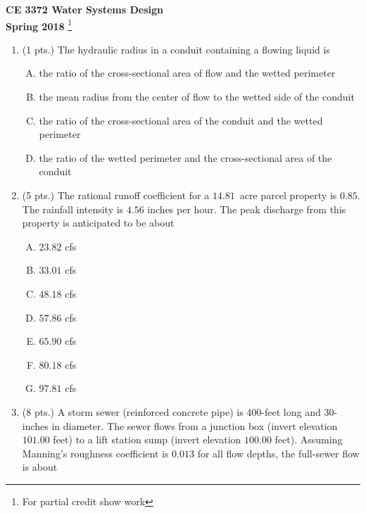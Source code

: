 \documentclass[11pt]{article}
\begin{document}
\begingroup
\begin{center}
{\textbf{{ CE 3372 Water Systems Design}  \\ Spring 2018} \footnote{For partial credit show work}
}
\end{center}
\endgroup


\begin{enumerate}
\item  (1 pts.)
The hydraulic radius in a conduit containing a flowing liquid is
\begin{enumerate} [(A)]
\item	the ratio of the cross-sectional area of flow and the wetted perimeter
\item	the mean radius from the center of flow to the wetted side of the conduit
\item	the ratio of the cross-sectional area of the conduit and the wetted perimeter
\item	the ratio of the wetted perimeter and the cross-sectional area of the conduit
\end{enumerate}
\item (5 pts.)
The rational runoff coefficient for a $14.81$~acre parcel property is $0.85$.  
The rainfall intensity is $4.56$ inches per hour.  
The peak discharge from this property is anticipated to be about
\begin{enumerate} [(A)]
\item $23.82$ cfs
\item $33.01$ cfs
\item $48.18$ cfs
\item $57.86$ cfs
\item $65.90$ cfs
\item $80.18$ cfs
\item $97.81$ cfs
\end{enumerate}
\item  (8 pts.)
A storm sewer (reinforced concrete pipe) is 400-feet long and 30-inches in diameter.  The sewer flows from a junction box (invert elevation $101.00$ feet) to a lift station sump (invert elevation $100.00$ feet).  Assuming Manning's roughness coefficient is $0.013$ for all flow depths, the full-sewer flow is about%

\end{enumerate}
\end{document}
